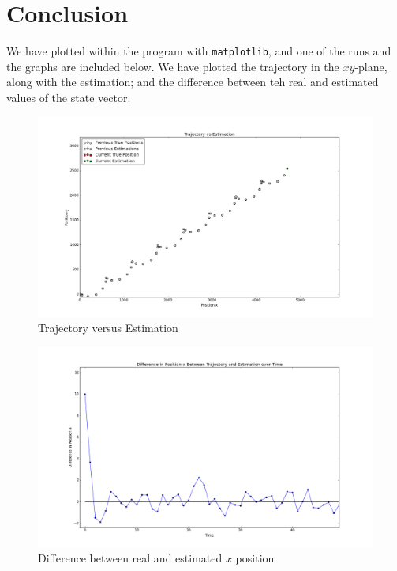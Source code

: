 \documentclass[12pt]{article}
\begin{document}
	\section{Conclusion}
	We have plotted within the program with \texttt{matplotlib}, and one of the runs and the graphs are included below. We have plotted the trajectory in the $xy$-plane, along with the estimation; and the difference between teh real and estimated values of the state vector.
	\begin{figure}[H]
		\centering
		\includegraphics[width=\textwidth]{TvE}
		\caption{Trajectory versus Estimation}
	\end{figure}

	\begin{figure}[H]
		\centering
		\includegraphics[width=\textwidth]{Diffpx}
		\caption{Difference between real and estimated $x$ position}
	\end{figure}
\end{document}
